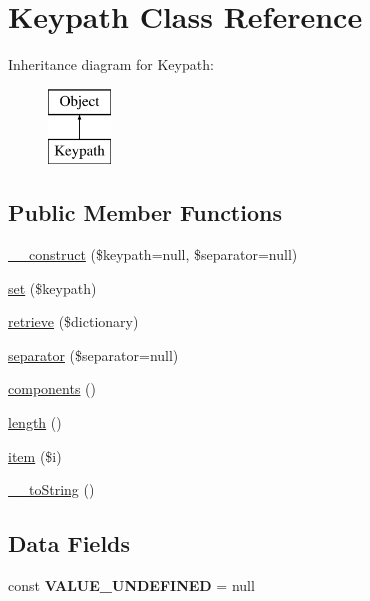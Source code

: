 \hypertarget{class_keypath}{
\section{Keypath Class Reference}
\label{class_keypath}
}
Inheritance diagram for Keypath:\begin{figure}[H]
\begin{center}
\leavevmode
\includegraphics[height=2.000000cm]{class_keypath}
\end{center}
\end{figure}
\subsection*{Public Member Functions}
\begin{DoxyCompactItemize}
\item 
\hyperlink{class_keypath_a0217decd1cd518128e64cc6cd637b526}{\_\-\_\-construct} (\$keypath=null, \$separator=null)
\item 
\hyperlink{class_keypath_af9db912d40fb85f93b887be6bfff6600}{set} (\$keypath)
\item 
\hyperlink{class_keypath_a6710951a33ce11883621e801fac3eb9d}{retrieve} (\$dictionary)
\item 
\hyperlink{class_keypath_af5b0ea7697e21a2d039171981f7f20bf}{separator} (\$separator=null)
\item 
\hyperlink{class_keypath_abed72eecd6815f748031505225cc1319}{components} ()
\item 
\hyperlink{class_keypath_a5facb816a7ce2173a30db9b0bc8ecf75}{length} ()
\item 
\hyperlink{class_keypath_ad552137db507ce7ec5ccf72a30ffac62}{item} (\$i)
\item 
\hyperlink{class_keypath_a7516ca30af0db3cdbf9a7739b48ce91d}{\_\-\_\-toString} ()
\end{DoxyCompactItemize}
\subsection*{Data Fields}
\begin{DoxyCompactItemize}
\item 
\hypertarget{class_keypath_a21e7ce51d423dfc89f5fa31db5979c94}{
const {\bfseries VALUE\_\-UNDEFINED} = null}
\label{class_keypath_a21e7ce51d423dfc89f5fa31db5979c94}

\end{DoxyCompactItemize}
